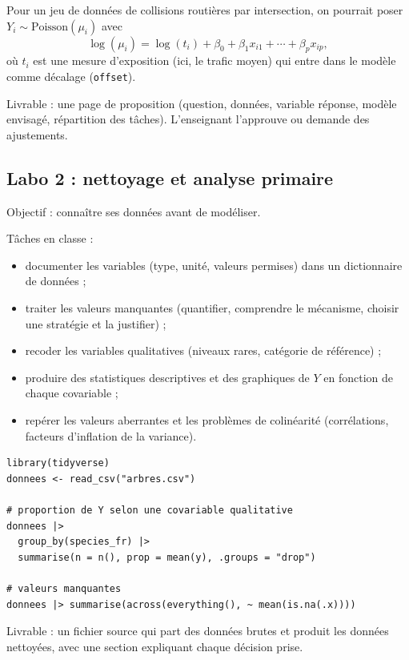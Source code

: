 \documentclass[11pt,letterpaper]{scrartcl}
\begin{document}
\begin{envexemple}
Pour un jeu de données de collisions routières par intersection, on pourrait poser $Y_i \sim \text{Poisson}(\mu_i)$ avec
\[
  \log(\mu_i) = \log(t_i) + \beta_0 + \beta_1 x_{i1} + \cdots + \beta_p x_{ip},
\]
où $t_i$ est une mesure d'exposition (ici, le trafic moyen) qui entre dans le modèle comme décalage (\texttt{offset}).
\end{envexemple}

Livrable : une page de proposition (question, données, variable réponse, modèle envisagé, répartition des tâches). L'enseignant l'approuve ou demande des ajustements.

\subsection{Labo 2 : nettoyage et analyse primaire}

Objectif : connaître ses données avant de modéliser.

Tâches en classe :
\begin{itemize}
  \item documenter les variables (type, unité, valeurs permises) dans un dictionnaire de données ;
  \item traiter les valeurs manquantes (quantifier, comprendre le mécanisme, choisir une stratégie et la justifier) ;
  \item recoder les variables qualitatives (niveaux rares, catégorie de référence) ;
  \item produire des statistiques descriptives et des graphiques de $Y$ en fonction de chaque covariable ;
  \item repérer les valeurs aberrantes et les problèmes de colinéarité (corrélations, facteurs d'inflation de la variance).
\end{itemize}

\begin{lstlisting}
library(tidyverse)
donnees <- read_csv("arbres.csv")

# proportion de Y selon une covariable qualitative
donnees |>
  group_by(species_fr) |>
  summarise(n = n(), prop = mean(y), .groups = "drop")

# valeurs manquantes
donnees |> summarise(across(everything(), ~ mean(is.na(.x))))
\end{lstlisting}

Livrable : un fichier source qui part des données brutes et produit les données nettoyées, avec une section expliquant chaque décision prise.
\end{document}
